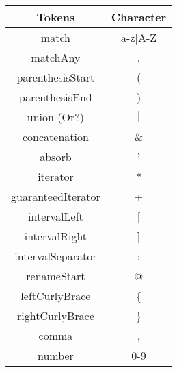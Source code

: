 \begin{tabular}{|c|c|}
    \hline
    \textbf{Tokens} & \textbf{Character}\\
    \hline
    match & a-z$\mid$A-Z\\
    \hline
    matchAny & .\\
    \hline
    parenthesisStart & (\\
    \hline
    parenthesisEnd & )\\
    \hline
    union (Or?) & $\mid$\\
    \hline
    concatenation & \&\\
    \hline
    absorb & '\\
    \hline
    iterator & *\\
    \hline
    guaranteedIterator & +\\
    \hline
    intervalLeft & [\\
    \hline
    intervalRight & ]\\
    \hline
    intervalSeparator & ;\\
    \hline
    renameStart & @\\
    \hline
    leftCurlyBrace & \{\\
    \hline
    rightCurlyBrace & \}\\
    \hline
    comma & ,\\
    \hline
    number & 0-9\\
    \hline
\end{tabular}
